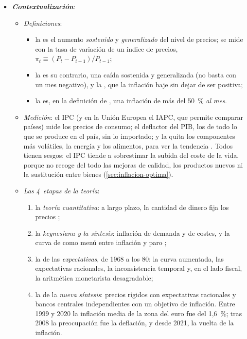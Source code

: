 \documentclass[11pt]{article}
\begin{document}
\begin{itemize}
\item \textbf{\emph{Contextualización}}:
  \begin{itemize}
  \item \emph{Definiciones}:
    \begin{itemize}
    \item la  es el aumento \emph{sostenido} y \emph{generalizado} del nivel de precios; se mide con la tasa de variación de un índice de precios, $\pi_t\equiv(P_t-P_{t-1})/P_{t-1}$;
    \item la  es su contrario, una caída sostenida y generalizada (no basta con un mes negativo), y la , que la inflación baje sin dejar de ser positiva;
    \item la  es, en la definición de \textcite{Cagan1956Monetary}, una inflación de más del 50~\% \emph{al mes}.
    \end{itemize}
  \item \emph{Medición}: el IPC (y en la Unión Europea el IAPC, que permite comparar países) mide los precios de consumo; el deflactor del PIB, los de todo lo que se produce en el país, sin lo importado; y la  quita los componentes más volátiles, la energía y los alimentos, para ver la tendencia  . Todos tienen sesgos: el IPC tiende a sobrestimar la subida del coste de la vida, porque no recoge del todo las mejoras de calidad, los productos nuevos ni la sustitución entre bienes (\ref{sec:inflacion-optima}).
  \item \emph{Las 4~etapas de la teoría}:
    \begin{enumerate}
    \item la \emph{teoría cuantitativa}: a largo plazo, la cantidad de dinero fija los precios ;
    \item la \emph{keynesiana y la síntesis}: inflación de demanda y de costes, y la curva de  como menú entre inflación y paro\nocite{Phillips1958,SamuelsonSolow1960Analytical} ;
    \item la de las \emph{expectativas}, de 1968 a los 80: la curva aumentada\nocite{Friedman1968Role,Phelps1967Phillips}, las expectativas racionales\nocite{Lucas1972Expectations}, la inconsistencia temporal\nocite{KydlandPrescott1977Rules} y, en el lado fiscal, la aritmética monetarista desagradable\nocite{SargentWallace1981};
    \item la de la \emph{nueva síntesis}: precios rígidos con expectativas racionales y bancos centrales independientes con un objetivo de inflación. Entre 1999 y 2020 la inflación media de la zona del euro fue del 1,6~\%\nocite{Eurostat2026IAPC}; tras 2008 la preocupación fue la deflación, y desde 2021, la vuelta de la inflación\nocite{BernankeBlanchard2025What}.

\end{enumerate}
\end{itemize}
\end{itemize}
\end{document}
